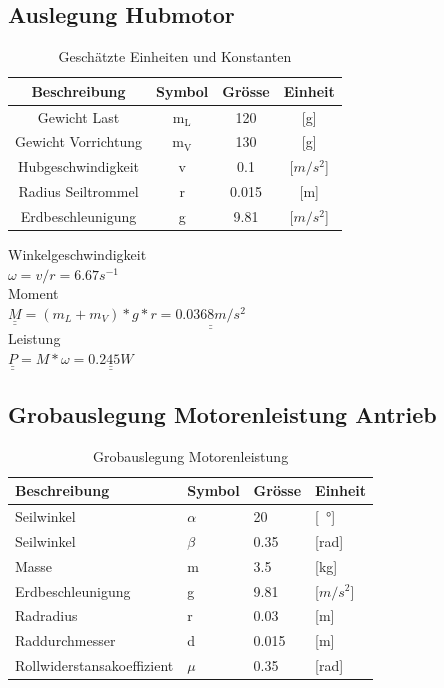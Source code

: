 \documentclass[a4paper]{report}
\begin{document}
\subsection{Auslegung Hubmotor}
\begin{table}[h!]
	\centering
	\begin{tabular}{|c|c|c|c|}
		\hline
		\textbf{Beschreibung}& \textbf{Symbol} & \textbf{Grösse} & \textbf{Einheit} \\
		\hline
		Gewicht Last& m$_{\text{L}}$ & 120 & [g] \\
		\hline
		Gewicht Vorrichtung& m$_{\text{V}}$ & 130 & [g] \\
		\hline
		Hubgeschwindigkeit& v & 0.1 & [$m/s^2$] \\
		\hline
		Radius Seiltrommel & r & 0.015 & [m]\\
		\hline
		Erdbeschleunigung & g & 9.81 & [$m/s^2$]\\
		\hline
	\end{tabular}
	\caption{Geschätzte Einheiten und Konstanten}
\end{table}
\noindent
Winkelgeschwindigkeit\\
$\omega=v/r=6.67s^{-1}$	\\
Moment\\
$\underline{\underline{M}}=(m_L+m_V)*g*r=\underline{\underline{0.0368m/s^2}}$\\
Leistung	\\
$\underline{\underline{P}}=M*\omega=\underline{\underline{0.245W}}$

\subsection{Grobauslegung Motorenleistung Antrieb}
\label{ssec:GrobMotor}
\begin{table}[h!]
	\begin{tabular}{|p{}|p{}|p{}|p{}|}
		\hline
		\textbf{Beschreibung} & \textbf{Symbol} & \textbf{Grösse}& \textbf{Einheit}  \\
		\hline
		Seilwinkel & $\alpha$ & 20 & [\SI{}{\degree}] \\
		\hline
		Seilwinkel & $\beta$ & 0.35 & [rad] \\
		\hline
		Masse & m & 3.5 & [kg] \\
		\hline
		Erdbeschleunigung & g & 9.81 & [$m/s^2$] \\
		\hline
		Radradius & r & 0.03 & [m] \\
		\hline
		Raddurchmesser & d & 0.015 & [m] \\
		\hline
		Rollwiderstansakoeffizient & $\mu$ & 0.35 & [rad] \\
		\hline
	\end{tabular}
	\caption{Grobauslegung Motorenleistung}
\label{tbl:Motorenleistung}
\end{table}
\end{document}
